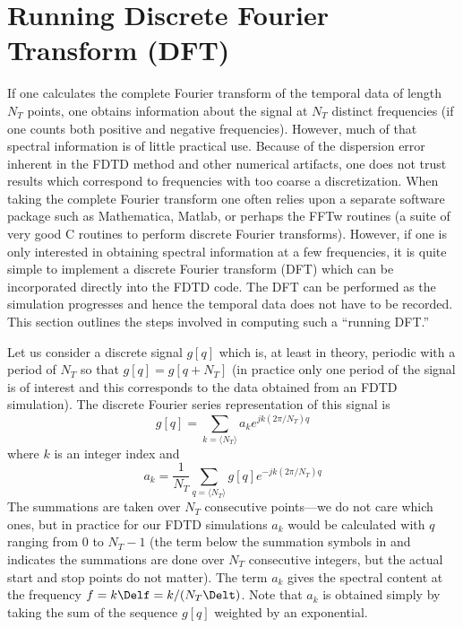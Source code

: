 \section{Running Discrete Fourier Transform (DFT) \label{sec:dft}}

If one calculates the complete Fourier transform of the temporal data
of length $N_T$ points, one obtains information about the signal at
$N_T$ distinct frequencies (if one counts both positive and negative
frequencies).  However, much of that spectral information is of little
practical use.  Because of the dispersion error inherent in the FDTD
method and other numerical artifacts, one does not trust results
which correspond to frequencies with too coarse a discretization.
When taking the complete Fourier transform one often relies upon a
separate software package such as Mathematica, Matlab, or perhaps the
FFTw routines (a suite of very good C routines to perform discrete
Fourier transforms).  However, if one is only interested in obtaining
spectral information at a few frequencies, it is quite simple to
implement a discrete Fourier transform (DFT) which can be incorporated
directly into the FDTD code.  The DFT can be performed as the
simulation progresses and hence the temporal data does not have to be
recorded.  This section outlines the steps involved in computing such
a ``running DFT.''

Let us consider a discrete signal $g[q]$ which is, at least in theory,
periodic with a period of $N_T$ so that $g[q] = g[q+N_T]$ (in practice
only one period of the signal is of interest and this corresponds to
the data obtained from an FDTD simulation).  The discrete Fourier
series representation of this signal is
\begin{equation}
  g[q] = \sum_{k=\langle N_T\rangle} a_k e^{jk(2\pi/N_T)q}
  \label{eq:dftTime}
\end{equation}
where $k$ is an integer index and
\begin{equation}
  a_k = \frac{1}{N_T}
      \sum_{q=\langle N_T\rangle} g[q] e^{-jk(2\pi/N_T)q}
  \label{eq:dftAk}
\end{equation}
The summations are taken over $N_T$ consecutive points---we do not
care which ones, but in practice for our FDTD simulations $a_k$ would
be calculated with $q$ ranging from $0$ to $N_T-1$ (the term below the
summation symbols in  and 
indicates the summations are done over $N_T$ consecutive integers, but
the actual start and stop points do not matter).  The term $a_k$ gives
the spectral content at the frequency $f = k\Delf = k/(N_T\Delt)$.
Note that $a_k$ is obtained simply by taking the sum of the sequence
$g[q]$ weighted by an exponential.

